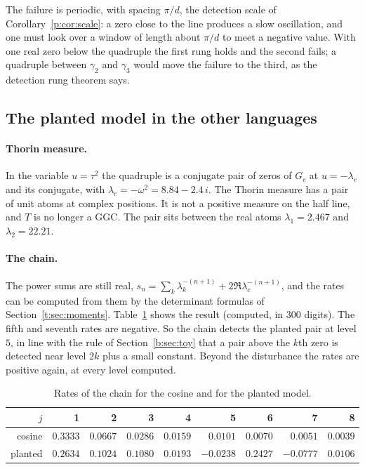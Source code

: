 The failure is periodic, with spacing $\pi/d$, the detection scale of Corollary~\ref{p:cor:scale}: a zero close to the line produces a slow oscillation, and one must look over a window of length about $\pi/d$ to meet a negative value. With one real zero below the quadruple the first rung holds and the second fails; a quadruple between $\gamma_2$ and $\gamma_3$ would move the failure to the third, as the detection rung theorem says.


\subsection{The planted model in the other languages}

\paragraph{Thorin measure.} In the variable $u=\tau^2$ the quadruple is a conjugate pair of zeros of $G_c$ at $u=-\lambda_c$ and its conjugate, with $\lambda_c=-\omega^2=8.84-2.4\,i$. The Thorin measure has a pair of unit atoms at complex positions. It is not a positive measure on the half line, and $T$ is no longer a GGC. The pair sits between the real atoms $\lambda_1=2.467$ and $\lambda_2=22.21$.

\paragraph{The chain.} The power sums are still real, $s_n=\sum_k\lambda_k^{-(n+1)}+2\Re\lambda_c^{-(n+1)}$, and the rates can be computed from them by the determinant formulas of Section~\ref{t:sec:moments}. Table~\ref{e:tab:chain} shows the result (computed, in $300$ digits). The fifth and seventh rates are negative. So the chain detects the planted pair at level $5$, in line with the rule of Section~\ref{b:sec:toy} that a pair above the $k$th zero is detected near level $2k$ plus a small constant. Beyond the disturbance the rates are positive again, at every level computed.

\begin{table}[ht]
\centering\footnotesize\setlength{\tabcolsep}{4pt}
\caption{Rates of the chain for the cosine and for the planted model.}\label{e:tab:chain}
\begin{tabular}{@{}rrrrrrrrr@{}}
\toprule
$j$ & 1 & 2 & 3 & 4 & 5 & 6 & 7 & 8\\
\midrule
cosine & $0.3333$ & $0.0667$ & $0.0286$ & $0.0159$ & $0.0101$ & $0.0070$ & $0.0051$ & $0.0039$\\
planted & $0.2634$ & $0.1024$ & $0.1080$ & $0.0193$ & $-0.0238$ & $0.2427$ & $-0.0777$ & $0.0106$\\
\bottomrule
\end{tabular}
\end{table}


